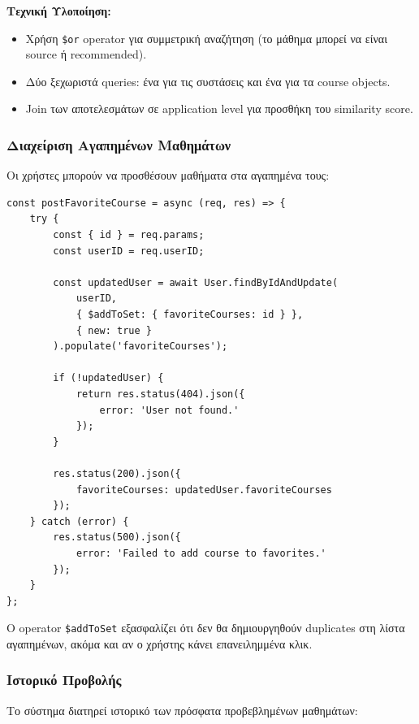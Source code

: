 \documentclass[a4paper,12pt]{article}
\begin{document}
\textbf{Τεχνική Υλοποίηση:}
\begin{itemize}
    \item Χρήση \texttt{\$or} operator για συμμετρική αναζήτηση (το μάθημα μπορεί να είναι source ή recommended).
    \item Δύο ξεχωριστά queries: ένα για τις συστάσεις και ένα για τα course objects.
    \item Join των αποτελεσμάτων σε application level για προσθήκη του similarity score.
\end{itemize}

\subsubsection{Διαχείριση Αγαπημένων Μαθημάτων}

Οι χρήστες μπορούν να προσθέσουν μαθήματα στα αγαπημένα τους:

\begin{verbatim}
const postFavoriteCourse = async (req, res) => {
    try {
        const { id } = req.params;
        const userID = req.userID;

        const updatedUser = await User.findByIdAndUpdate(
            userID,
            { $addToSet: { favoriteCourses: id } },
            { new: true }
        ).populate('favoriteCourses');

        if (!updatedUser) {
            return res.status(404).json({ 
                error: 'User not found.' 
            });
        }

        res.status(200).json({
            favoriteCourses: updatedUser.favoriteCourses
        });
    } catch (error) {
        res.status(500).json({ 
            error: 'Failed to add course to favorites.' 
        });
    }
};
\end{verbatim}

Ο operator \texttt{\$addToSet} εξασφαλίζει ότι δεν θα δημιουργηθούν duplicates στη λίστα αγαπημένων, ακόμα και αν ο χρήστης κάνει επανειλημμένα κλικ.

\subsubsection{Ιστορικό Προβολής}

Το σύστημα διατηρεί ιστορικό των πρόσφατα προβεβλημένων μαθημάτων:
\end{document}
